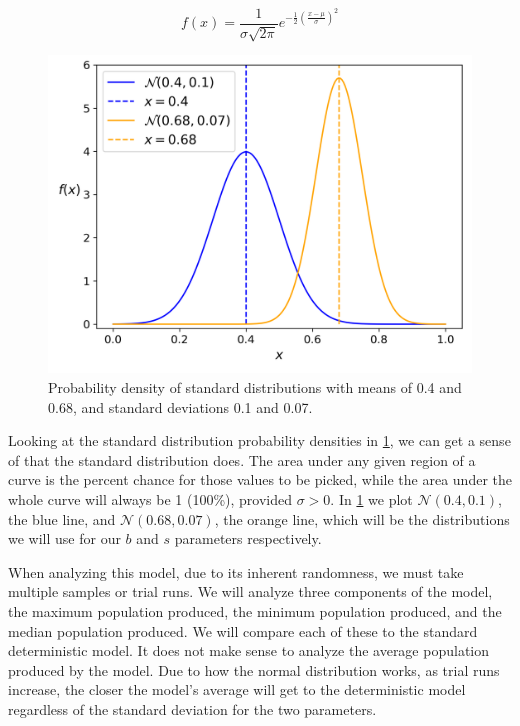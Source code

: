 \documentclass{article}
\begin{document}
\begin{equation} \label{eq:standard-distribution}
    f(x) = \frac{1}{\sigma\sqrt{2\pi}}e^{-\frac{1}{2}\left(\frac{x-\mu}{\sigma}\right)^2}
\end{equation}

\begin{figure}[h!]
    \centering
    \includegraphics[width=.5\linewidth]{plots/standard-distribution.png}
    \caption{Probability density of standard distributions with means of 0.4 and 0.68, and standard deviations 0.1 and 0.07.}
    \label{fig:standard-distribution}
\end{figure}

Looking at the standard distribution probability densities in \cref{fig:standard-distribution}, we can get a sense of that the standard distribution does. The area under any given region of a curve is the percent chance for those values to be picked, while the area under the whole curve will always be 1 (100\%), provided $\sigma > 0$. In \cref{fig:standard-distribution} we plot $\mathcal{N}(0.4, 0.1)$, the blue line, and $\mathcal{N}(0.68, 0.07)$, the orange line, which will be the distributions we will use for our $b$ and $s$ parameters respectively.

When analyzing this model, due to its inherent randomness, we must take multiple samples or trial runs. We will analyze three components of the model, the maximum population produced, the minimum population produced, and the median population produced. We will compare each of these to the standard deterministic model. It does not make sense to analyze the average population produced by the model. Due to how the normal distribution works, as trial runs increase, the closer the model's average will get to the deterministic model regardless of the standard deviation for the two parameters.
\end{document}

